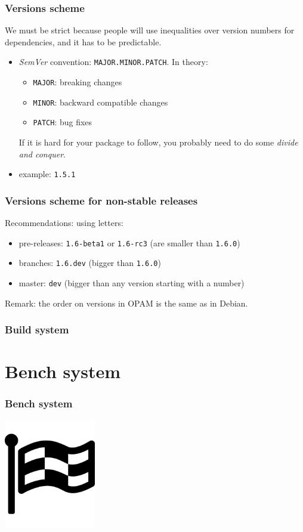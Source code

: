 \documentclass{beamer}
\begin{document}
  \begin{frame}
    \frametitle{Versions scheme}
    We must be strict because people will use inequalities over version numbers for dependencies, and it has to be predictable.
    \begin{itemize}
      \item \emph{SemVer} convention: \texttt{MAJOR.MINOR.PATCH}. In theory:
        \begin{itemize}
          \item \texttt{MAJOR}: breaking changes
          \item \texttt{MINOR}: backward compatible changes
          \item \texttt{PATCH}: bug fixes
        \end{itemize}
        If it is hard for your package to follow, you probably need to do some \emph{divide and conquer}.
      \item example: \texttt{1.5.1}
    \end{itemize}
  \end{frame}
  \begin{frame}
    \frametitle{Versions scheme for non-stable releases}
    Recommendations: using letters:
    \begin{itemize}
      \item pre-releases: \texttt{1.6-beta1} or \texttt{1.6-rc3} (are smaller than \texttt{1.6.0})
      \item branches: \texttt{1.6.dev} (bigger than \texttt{1.6.0})
      \item master: \texttt{dev} (bigger than any version starting with a number)
    \end{itemize}
    Remark: the order on versions in OPAM is the same as in Debian.
  \end{frame}
  \begin{frame}
    \frametitle{Build system}
  \end{frame}

  \section{Bench system}
  \begin{frame}
    \frametitle{Bench system}
    \begin{center}
      \includegraphics[width=4cm]{images/bench}
    \end{center}
  \end{frame}
\end{document}
